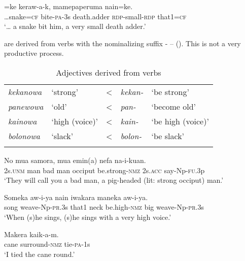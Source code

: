 \ea%
\label{ex:3:x86}
=ke keraw-a-k, mamepaperuma  nain=ke. \\
{\dots}snake=\textsc{cf} bite-\textsc{pa}-3s death.adder \textsc{rdp}-small-\textsc{rdp} that1=\textsc{cf}\\
\glt`{\dots} a snake bit him, a very small death adder.'
\z

 are derived from verbs with the nominalizing suffix \nobreakdash- -- (). This is not a very productive process.

\begin{table}
\caption{Adjectives derived from verbs}
\label{tab:3:derivedadj}
 
\begin{tabular}{>{\itshape}llc>{\itshape}ll}
\mytoprule
kekanowa &`strong' &{{\textless}} &kekan- &`be strong'\\
panewowa &`old' &{{\textless}} &pan- &`become old'\\
kainowa &`high (voice)' &{{\textless}} &kain- &`be high (voice)'\\
bolonowa &`slack' &{{\textless}} &bolon- &`be slack'\\
\mybottomrule
\end{tabular}
\end{table}


\ea%
\label{ex:3:x1766}
\gll No mua samora, mua emin(a) \textstyleEmphasizedVernacularWords{-} nefa na-i-kuan.\\
2s.\textsc{unm} man bad man occiput be.strong-\textsc{nmz} 2s.\textsc{acc} say-Np-\textsc{fu}.3p\\
\glt`They will call you a bad man, a pig-headed (lit: strong occiput) man.'
\z

\ea%
\label{ex:3:x1765}
\gll Someka aw-i-ya nain iwakara  maneka aw-i-ya.\\
song weave-Np-\textsc{pr}.3s that1 neck be.high-\textsc{nmz} big weave-Np-\textsc{pr}.3s\\
\glt`When (s)he sings, (s)he sings with a very high voice.'
\z

\ea%
\label{ex:3:x1767}
\gll Makera \textstyleEmphasizedVernacularWords{-} kaik-a-m. \\
cane surround-\textsc{nmz} tie-\textsc{pa}-1s\\
\glt`I tied the cane round.'
\z

